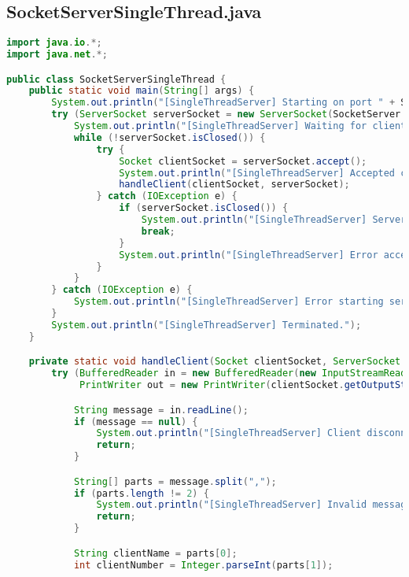 \documentclass{article}
\begin{document}
\subsection{SocketServerSingleThread.java}
\begin{lstlisting}[language=Java, caption={SocketServerSingleThread.java - Single-threaded Server}]
import java.io.*;
import java.net.*;

public class SocketServerSingleThread {
    public static void main(String[] args) {
        System.out.println("[SingleThreadServer] Starting on port " + SocketServer.SERVER_PORT);
        try (ServerSocket serverSocket = new ServerSocket(SocketServer.SERVER_PORT)) {
            System.out.println("[SingleThreadServer] Waiting for client connections...");
            while (!serverSocket.isClosed()) {
                try {
                    Socket clientSocket = serverSocket.accept();
                    System.out.println("[SingleThreadServer] Accepted connection from " + clientSocket.getInetAddress());
                    handleClient(clientSocket, serverSocket);
                } catch (IOException e) {
                    if (serverSocket.isClosed()) {
                        System.out.println("[SingleThreadServer] Server socket closed, shutting down.");
                        break;
                    }
                    System.out.println("[SingleThreadServer] Error accepting client connection: " + e.getMessage());
                }
            }
        } catch (IOException e) {
            System.out.println("[SingleThreadServer] Error starting server: " + e.getMessage());
        }
        System.out.println("[SingleThreadServer] Terminated.");
    }

    private static void handleClient(Socket clientSocket, ServerSocket serverSocket) {
        try (BufferedReader in = new BufferedReader(new InputStreamReader(clientSocket.getInputStream()));
             PrintWriter out = new PrintWriter(clientSocket.getOutputStream(), true)) {

            String message = in.readLine();
            if (message == null) {
                System.out.println("[SingleThreadServer] Client disconnected before sending a message.");
                return;
            }

            String[] parts = message.split(",");
            if (parts.length != 2) {
                System.out.println("[SingleThreadServer] Invalid message format from client.");
                return;
            }

            String clientName = parts[0];
            int clientNumber = Integer.parseInt(parts[1]);


\end{lstlisting}
\end{document}
